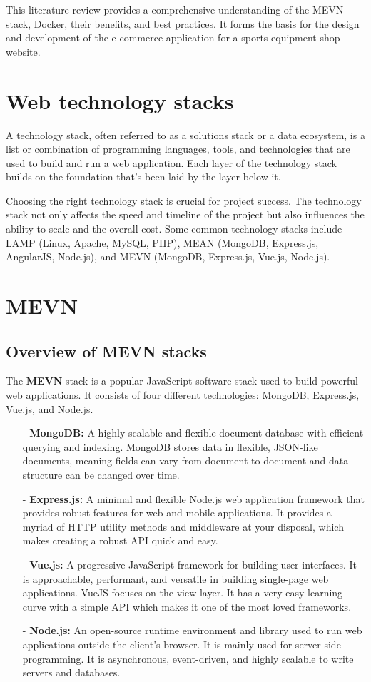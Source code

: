 This literature review provides a comprehensive understanding of the MEVN stack, Docker, their benefits, and best practices. It forms the basis for the design and development of the e-commerce application for a sports equipment shop website.
\section{Web technology stacks}
A technology stack, often referred to as a solutions stack or a data ecosystem, is a list or combination of programming languages, tools, and technologies that are used to build and run a web application. Each layer of the technology stack builds on the foundation that's been laid by the layer below it.

Choosing the right technology stack is crucial for project success. The technology stack not only affects the speed and timeline of the project but also influences the ability to scale and the overall cost. Some common technology stacks include LAMP (Linux, Apache, MySQL, PHP), MEAN (MongoDB, Express.js, AngularJS, Node.js), and MEVN (MongoDB, Express.js, Vue.js, Node.js).
\section{MEVN}
\subsection{Overview of MEVN stacks}
The \textbf{MEVN} stack is a popular JavaScript software stack used to build powerful web applications. It consists of four different technologies: MongoDB, Express.js, Vue.js, and Node.js.
\begin{itemize}
    \item[-] \textbf{MongoDB:} A highly scalable and flexible document database with efficient querying and indexing. MongoDB stores data in flexible, JSON-like documents, meaning fields can vary from document to document and data structure can be changed over time.
    \item[-] \textbf{Express.js:} A minimal and flexible Node.js web application framework that provides robust features for web and mobile applications. It provides a myriad of HTTP utility methods and middleware at your disposal, which makes creating a robust API quick and easy.
    \item[-] \textbf{Vue.js:} A progressive JavaScript framework for building user interfaces. It is approachable, performant, and versatile in building single-page web applications. VueJS focuses on the view layer. It has a very easy learning curve with a simple API which makes it one of the most loved frameworks.
    \item[-] \textbf{Node.js:} An open-source runtime environment and library used to run web applications outside the client's browser. It is mainly used for server-side programming. It is asynchronous, event-driven, and highly scalable to write servers and databases.
\end{itemize}

